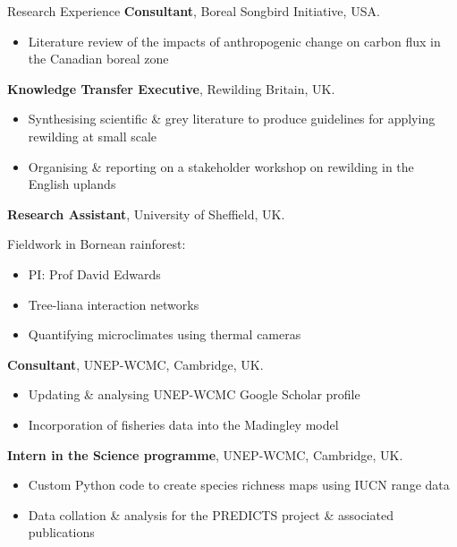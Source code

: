 \renewcommand\labelitemi{$\diamond$}

\begin{rubric}{Research Experience}
\entry*[2020]%
	\textbf{Consultant}, Boreal Songbird Initiative, USA.
	\begin{itemize}[topsep=0pt,itemsep=-1ex,partopsep=1ex,parsep=1ex]
	\item Literature review of the impacts of anthropogenic change on carbon flux in the Canadian boreal zone
	\end{itemize}
\entry*[2016]%
	\textbf{Knowledge Transfer Executive}, Rewilding Britain, UK.
	\begin{itemize}[topsep=0pt,itemsep=-1ex,partopsep=1ex,parsep=1ex]
	\item Synthesising scientific \& grey literature to produce guidelines for applying rewilding at small scale
	\item Organising \& reporting on a stakeholder workshop on rewilding in the English uplands \parencite{sandom_rewilding_2019}
	\end{itemize}
\entry*[2014]%
	\textbf{Research Assistant}, University of Sheffield, UK.
	\par Fieldwork in Bornean rainforest:
	\begin{itemize}[topsep=0pt,itemsep=-1ex,partopsep=1ex,parsep=1ex]
	\item PI: Prof David Edwards
	\item Tree-liana interaction networks \parencite{magrach_selective_2016}
	\item Quantifying microclimates using thermal cameras \parencite{scheffers_extreme_2017}
	\end{itemize}
\entry*[2013 -- 2014]%
	\textbf{Consultant}, UNEP-WCMC, Cambridge, UK.
	\begin{itemize}[topsep=0pt,itemsep=-1ex,partopsep=1ex,parsep=1ex]
	\item Updating \& analysing UNEP-WCMC Google Scholar profile
	\item Incorporation of fisheries data into the Madingley model
	\end{itemize}
\entry*[2013]%
	\textbf{Intern in the Science programme}, UNEP-WCMC, Cambridge, UK.
	\begin{itemize}[topsep=0pt,itemsep=-1ex,partopsep=1ex,parsep=1ex]
	\item Custom Python code to create species richness maps using IUCN range data
	\item  Data collation \& analysis for the PREDICTS project \& associated publications \parencite{newbold_global_2015, hudson_predicts_2014, hudson_database_2017}
	\end{itemize}
%
\end{rubric}